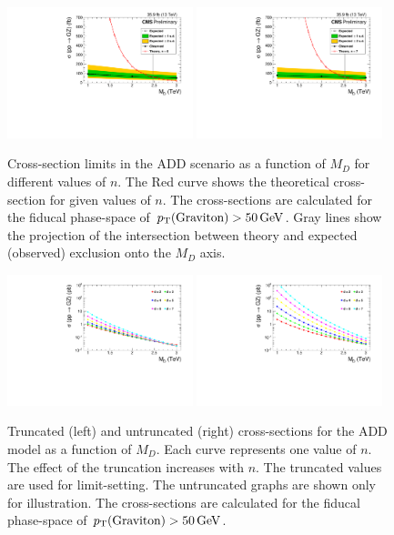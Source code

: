 \begin{figure}[hbtp]
    \includegraphics[width=0.48\textwidth]{figures/ADD/add_limit_nd6.pdf}
    \includegraphics[width=0.48\textwidth]{figures/ADD/add_limit_nd7.pdf}

  \caption{Cross-section limits in the ADD scenario as a function of $M_{D}$ for different values of $n$.
		   The Red curve shows the theoretical cross-section for given values of $n$.
		   The cross-sections are calculated for the fiducal phase-space of $p_{\mathrm{T}}(\rm Graviton) > 50\,\text{Ge\hspace{-.08em}V}$.
			Gray lines show the projection of the intersection between theory and expected (observed) exclusion onto the $M_{D}$ axis.
  }
    \label{fig:limits_add_xs}
\end{figure}

\begin{figure}[hbtp]
  \centering
  \includegraphics[width=0.48\textwidth]{figures/ADD/ADD_xs_v_md_truncated.pdf}
  \includegraphics[width=0.48\textwidth]{figures/ADD/ADD_xs_v_md_untruncated.pdf}
  \caption{Truncated (left) and untruncated (right) cross-sections for the ADD model as a function of $M_{D}$. Each curve represents one value of $n$.
			The effect of the truncation increases with $n$. The truncated values are used for limit-setting. The untruncated graphs are shown only for illustration.
			The cross-sections are calculated for the fiducal phase-space of $p_{\mathrm{T}}(\rm Graviton) > 50\,\text{Ge\hspace{-.08em}V}$.
  }
  \label{fig:xs_add_md}
\end{figure}

